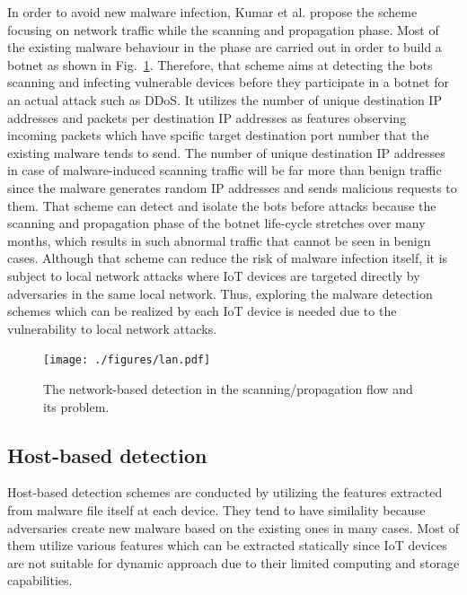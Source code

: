 \documentclass{ieeeaccess}
\newcommand{\myfigurename}{Fig.}
\begin{document}
In order to avoid new malware infection, Kumar et al. \cite{net} propose the scheme focusing on network traffic while the scanning and propagation phase.
Most of the existing malware behaviour in the phase are carried out in order to build a botnet as shown in \myfigurename~\ref{fig:lan}.
Therefore, that scheme aims at detecting the bots scanning and infecting vulnerable devices before they participate in a botnet for an actual attack such as DDoS.
It utilizes the number of unique destination IP addresses and packets per destination IP addresses as features observing incoming packets which have spcific target destination port number that the existing malware tends to send.
The number of unique destination IP addresses in case of malware-induced scanning traffic will be far more than benign traffic since the malware generates random IP addresses and sends malicious requests to them.
That scheme can detect and isolate the bots before attacks because the scanning and propagation phase of the botnet life-cycle stretches over many months, which results in such abnormal traffic that cannot be seen in benign cases.
Although that scheme can reduce the risk of malware infection itself, it is subject to local network attacks where IoT devices are targeted directly by adversaries in the same local network.
Thus, exploring the malware detection schemes which can be realized by each IoT device is needed due to the vulnerability to local network attacks.

\begin{figure}[t]
 \centering
 \texttt{[image: ./figures/lan.pdf]}
 \caption{The network-based detection in the scanning/propagation flow and its problem.} 
 \label{fig:lan}
\end{figure}

\subsection{Host-based detection}
Host-based detection schemes are conducted by utilizing the features extracted from malware file itself at each device.
They tend to have similality because adversaries create new malware based on the existing ones \cite{om, hwang, cfg, cfg2, op-graph, func-graph, api-graph} in many cases.
Most of them utilize various features which can be extracted statically since IoT devices are not suitable for dynamic approach due to their limited computing and storage capabilities.
\end{document}
